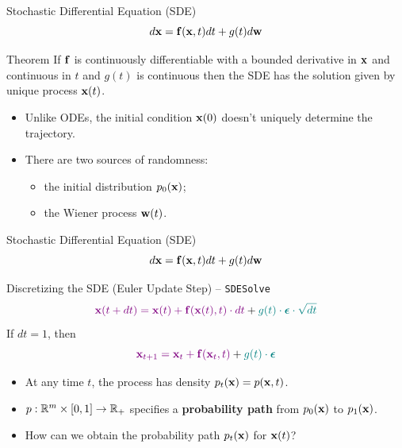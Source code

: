 \documentclass{beamer}
\renewcommand{\eqpause}{}
\begin{document}
\begin{frame}{Stochastic Differential Equation (SDE)}
	\[
		d\mathbf{x} = \mathbf{f}(\mathbf{x}, t) dt + g(t) d \mathbf{w}
	\]
	\begin{block}{Theorem}
		If $\mathbf{f}$ is continuously differentiable with a bounded derivative in $\mathbf{x}$ 
		and continuous in $t$ and $g(t)$ is continuous then the SDE has the solution given by unique process $\mathbf{x}(t)$.
	\end{block}

	\begin{itemize}
		\item Unlike ODEs, the initial condition $\mathbf{x}(0)$ doesn't uniquely determine the trajectory.
		\item There are two sources of randomness: 
		\begin{itemize}
			\item the initial distribution $p_0(\mathbf{x})$;
			\item the Wiener process $\mathbf{w}(t)$.
		\end{itemize}
	\end{itemize}
\end{frame}
\begin{frame}{Stochastic Differential Equation (SDE)}
	\[
		d\mathbf{x} = \mathbf{f}(\mathbf{x}, t) dt + g(t) d \mathbf{w}
	\]
	\vspace{-0.3cm}
	\eqpause
	\begin{block}{Discretizing the SDE (Euler Update Step) – \texttt{SDESolve}}
		\vspace{-0.3cm}
		\[
			{\color{violet}\mathbf{x}(t + dt) = \mathbf{x}(t) + \mathbf{f}(\mathbf{x}(t), t) \cdot dt} + {\color{teal}g(t) \cdot \boldsymbol{\epsilon} \cdot \sqrt{dt}}
		\]
		If $dt=1$, then
		\vspace{-0.3cm}
		\[
			{\color{violet}\mathbf{x}_{t + 1} = \mathbf{x}_t + \mathbf{f}(\mathbf{x}_t, t)} + {\color{teal}g(t) \cdot \boldsymbol{\epsilon}}
		\]
		\vspace{-0.7cm}
	\end{block}
	\eqpause
	\begin{itemize}
		\item At any time $t$, the process has density $p_t(\mathbf{x}) = p(\mathbf{x}, t)$.
		\item $p: \mathbb{R}^m \times [0,1] \rightarrow \mathbb{R}_+$ specifies a \textbf{probability path} from $p_0(\mathbf{x})$ to $p_1(\mathbf{x})$.
		\item How can we obtain the probability path $p_t(\mathbf{x})$ for $\mathbf{x}(t)$?
	\end{itemize}
\end{frame}
\end{document}
